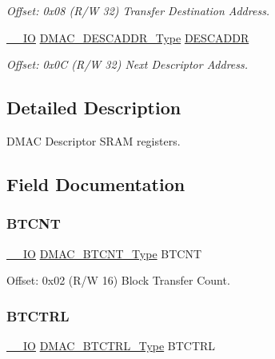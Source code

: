\begin{DoxyCompactItemize}
\begin{DoxyCompactList}\small\item\em Offset\+: 0x08 (R/W 32) Transfer Destination Address. \end{DoxyCompactList}\item 
\mbox{\hyperlink{core__cm0plus_8h_aec43007d9998a0a0e01faede4133d6be}{\+\_\+\+\_\+\+IO}} \mbox{\hyperlink{union_d_m_a_c___d_e_s_c_a_d_d_r___type}{D\+M\+A\+C\+\_\+\+D\+E\+S\+C\+A\+D\+D\+R\+\_\+\+Type}} \mbox{\hyperlink{struct_dmac_descriptor_a1c8d3adfe0bd45b3f49ed6b3bc884674}{D\+E\+S\+C\+A\+D\+DR}}
\begin{DoxyCompactList}\small\item\em Offset\+: 0x0C (R/W 32) Next Descriptor Address. \end{DoxyCompactList}\end{DoxyCompactItemize}


\subsection{Detailed Description}
D\+M\+AC Descriptor S\+R\+AM registers. 

\subsection{Field Documentation}
\mbox{\label{struct_dmac_descriptor_a661d265c3dd9eec59e6f687eddaa3e6f}} 
\subsubsection{\texorpdfstring{BTCNT}{BTCNT}}
{\footnotesize\ttfamily \mbox{\hyperlink{core__cm0plus_8h_aec43007d9998a0a0e01faede4133d6be}{\+\_\+\+\_\+\+IO}} \mbox{\hyperlink{union_d_m_a_c___b_t_c_n_t___type}{D\+M\+A\+C\+\_\+\+B\+T\+C\+N\+T\+\_\+\+Type}} B\+T\+C\+NT}



Offset\+: 0x02 (R/W 16) Block Transfer Count. 

\mbox{\label{struct_dmac_descriptor_a88d1dbe42db9afd1c76f28a8df3264e0}} 
\subsubsection{\texorpdfstring{BTCTRL}{BTCTRL}}
{\footnotesize\ttfamily \mbox{\hyperlink{core__cm0plus_8h_aec43007d9998a0a0e01faede4133d6be}{\+\_\+\+\_\+\+IO}} \mbox{\hyperlink{union_d_m_a_c___b_t_c_t_r_l___type}{D\+M\+A\+C\+\_\+\+B\+T\+C\+T\+R\+L\+\_\+\+Type}} B\+T\+C\+T\+RL}



